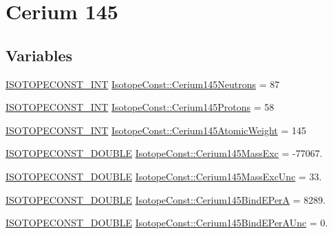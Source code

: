 \hypertarget{group___isotope_const-_cerium-_ce145}{}\section{Cerium 145}
\label{group___isotope_const-_cerium-_ce145}
\subsection*{Variables}
\begin{DoxyCompactItemize}
\item 
\mbox{\hyperlink{group___isotope_const-_macros_ga5f18360b3e99483a35c32d789e62621c}{I\+S\+O\+T\+O\+P\+E\+C\+O\+N\+S\+T\+\_\+\+I\+NT}} \mbox{\hyperlink{group___isotope_const-_cerium-_ce145_gae87acf7995d4d216305d304b7efa4476}{Isotope\+Const\+::\+Cerium145\+Neutrons}} = 87
\item 
\mbox{\hyperlink{group___isotope_const-_macros_ga5f18360b3e99483a35c32d789e62621c}{I\+S\+O\+T\+O\+P\+E\+C\+O\+N\+S\+T\+\_\+\+I\+NT}} \mbox{\hyperlink{group___isotope_const-_cerium-_ce145_gabecba4dc32f1306d7803630530c39cba}{Isotope\+Const\+::\+Cerium145\+Protons}} = 58
\item 
\mbox{\hyperlink{group___isotope_const-_macros_ga5f18360b3e99483a35c32d789e62621c}{I\+S\+O\+T\+O\+P\+E\+C\+O\+N\+S\+T\+\_\+\+I\+NT}} \mbox{\hyperlink{group___isotope_const-_cerium-_ce145_ga49c1c0781c8a0e9bbb1f9885eb2475b2}{Isotope\+Const\+::\+Cerium145\+Atomic\+Weight}} = 145
\item 
\mbox{\hyperlink{group___isotope_const-_macros_ga8f45a7272ce02c0b4c65c44636ed719a}{I\+S\+O\+T\+O\+P\+E\+C\+O\+N\+S\+T\+\_\+\+D\+O\+U\+B\+LE}} \mbox{\hyperlink{group___isotope_const-_cerium-_ce145_ga8714c7377c20f551abe8a40ae04f0e50}{Isotope\+Const\+::\+Cerium145\+Mass\+Exc}} = -\/77067.
\item 
\mbox{\hyperlink{group___isotope_const-_macros_ga8f45a7272ce02c0b4c65c44636ed719a}{I\+S\+O\+T\+O\+P\+E\+C\+O\+N\+S\+T\+\_\+\+D\+O\+U\+B\+LE}} \mbox{\hyperlink{group___isotope_const-_cerium-_ce145_ga225359418eb60395ea2bd90ccbb313f0}{Isotope\+Const\+::\+Cerium145\+Mass\+Exc\+Unc}} = 33.
\item 
\mbox{\hyperlink{group___isotope_const-_macros_ga8f45a7272ce02c0b4c65c44636ed719a}{I\+S\+O\+T\+O\+P\+E\+C\+O\+N\+S\+T\+\_\+\+D\+O\+U\+B\+LE}} \mbox{\hyperlink{group___isotope_const-_cerium-_ce145_gae8980316611b73785e74135c7959a657}{Isotope\+Const\+::\+Cerium145\+Bind\+E\+PerA}} = 8289.
\item 
\mbox{\hyperlink{group___isotope_const-_macros_ga8f45a7272ce02c0b4c65c44636ed719a}{I\+S\+O\+T\+O\+P\+E\+C\+O\+N\+S\+T\+\_\+\+D\+O\+U\+B\+LE}} \mbox{\hyperlink{group___isotope_const-_cerium-_ce145_ga25215d30de6c1d6e75bf2aca027965f2}{Isotope\+Const\+::\+Cerium145\+Bind\+E\+Per\+A\+Unc}} = 0.

\end{DoxyCompactItemize}
